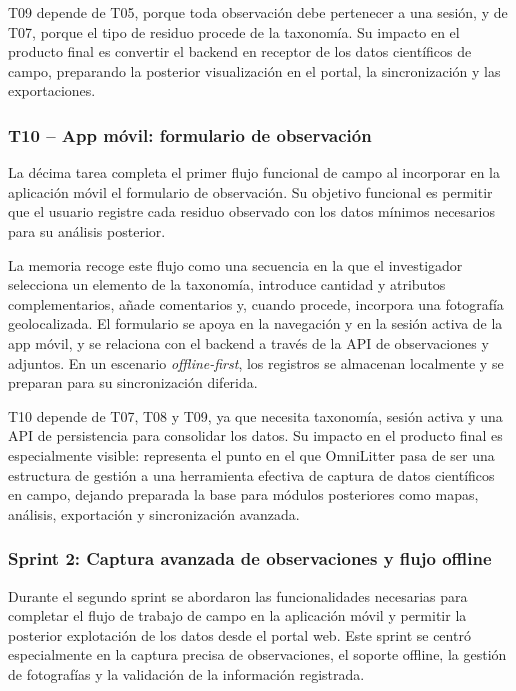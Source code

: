 T09 depende de T05, porque toda observación debe pertenecer a una sesión, y de T07,
porque el tipo de residuo procede de la taxonomía. Su impacto en el producto final
es convertir el backend en receptor de los datos científicos de campo, preparando
la posterior visualización en el portal, la sincronización y las exportaciones.

\subsubsection{T10 -- App móvil: formulario de observación}

La décima tarea completa el primer flujo funcional de campo al incorporar en la
aplicación móvil el formulario de observación. Su objetivo funcional es permitir
que el usuario registre cada residuo observado con los datos mínimos necesarios
para su análisis posterior.

La memoria recoge este flujo como una secuencia en la que el investigador selecciona
un elemento de la taxonomía, introduce cantidad y atributos complementarios, añade
comentarios y, cuando procede, incorpora una fotografía geolocalizada. El formulario
se apoya en la navegación y en la sesión activa de la app móvil, y se relaciona con
el backend a través de la API de observaciones y adjuntos. En un escenario
\textit{offline-first}, los registros se almacenan localmente y se preparan para su
sincronización diferida.

T10 depende de T07, T08 y T09, ya que necesita taxonomía, sesión activa y una API de
persistencia para consolidar los datos. Su impacto en el producto final es
especialmente visible: representa el punto en el que OmniLitter pasa de ser una
estructura de gestión a una herramienta efectiva de captura de datos científicos en
campo, dejando preparada la base para módulos posteriores como mapas, análisis,
exportación y sincronización avanzada.

\subsubsection{Sprint 2: Captura avanzada de observaciones y flujo offline}

Durante el segundo sprint se abordaron las funcionalidades necesarias para completar
el flujo de trabajo de campo en la aplicación móvil y permitir la posterior explotación
de los datos desde el portal web. Este sprint se centró especialmente en la captura
precisa de observaciones, el soporte offline, la gestión de fotografías y la validación
de la información registrada.

